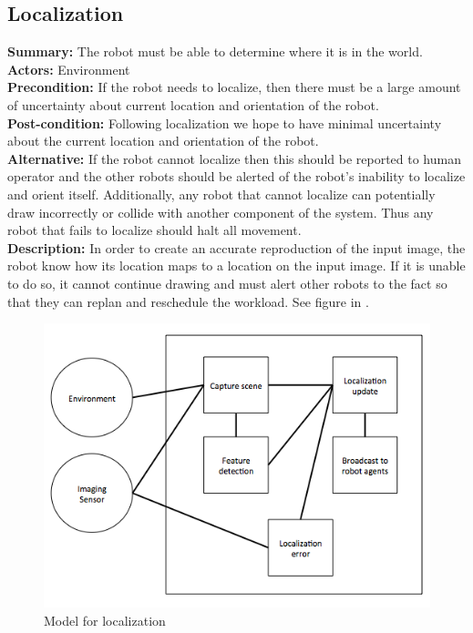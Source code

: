 \subsection{Localization}
\textbf{Summary:} The robot must be able to determine where it is in the world. \\
\textbf{Actors:} Environment \\
\textbf{Precondition:} If the robot needs to localize, then there must be a large amount of uncertainty about current location and orientation of the robot. \\
\textbf{Post-condition:} Following localization we hope to have minimal uncertainty about the current location and orientation of the robot. \\
\textbf{Alternative:} If the robot cannot localize then this should be reported to human operator and the other robots should be alerted of the robot's inability to localize and orient itself. Additionally, any robot that cannot localize can potentially draw incorrectly or collide with another component of the system. Thus any robot that fails to localize should halt all movement. \\
\textbf{Description:} In order to create an accurate reproduction of the input image, the robot know how its location maps to a location on the input image. If it is unable to do so, it cannot continue drawing and must alert other robots to the fact so that they can replan and reschedule the workload. See figure in .\\

\begin{figure}
 \centering
  \includegraphics[width=0.48\columnwidth]{figs/use_case-localization.jpg}
\caption{Model for localization}
 \label{fig:localize}
\end{figure}

